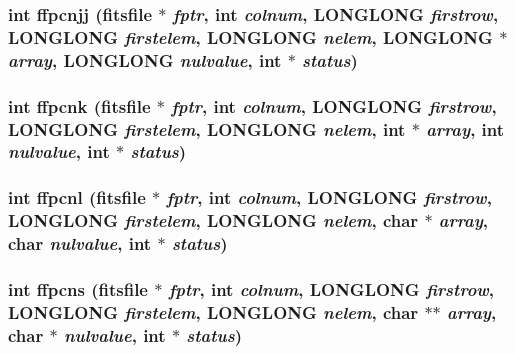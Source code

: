 \subsubsection{\setlength{\rightskip}{0pt plus 5cm}int ffpcnjj (\bf{fitsfile} $\ast$ {\em fptr}, int {\em colnum}, \bf{LONGLONG} {\em firstrow}, \bf{LONGLONG} {\em firstelem}, \bf{LONGLONG} {\em nelem}, \bf{LONGLONG} $\ast$ {\em array}, \bf{LONGLONG} {\em nulvalue}, int $\ast$ {\em status})}\label{test_2roimasker_2fitsio_8h_74f7a5525896c9793648df097c2bdcc9}


\subsubsection{\setlength{\rightskip}{0pt plus 5cm}int ffpcnk (\bf{fitsfile} $\ast$ {\em fptr}, int {\em colnum}, \bf{LONGLONG} {\em firstrow}, \bf{LONGLONG} {\em firstelem}, \bf{LONGLONG} {\em nelem}, int $\ast$ {\em array}, int {\em nulvalue}, int $\ast$ {\em status})}\label{test_2roimasker_2fitsio_8h_d93fc5e0ad1ffc1672875c4cd27ce94d}


\subsubsection{\setlength{\rightskip}{0pt plus 5cm}int ffpcnl (\bf{fitsfile} $\ast$ {\em fptr}, int {\em colnum}, \bf{LONGLONG} {\em firstrow}, \bf{LONGLONG} {\em firstelem}, \bf{LONGLONG} {\em nelem}, char $\ast$ {\em array}, char {\em nulvalue}, int $\ast$ {\em status})}\label{test_2roimasker_2fitsio_8h_02845255614e2b0e1dce064727cd2303}


\subsubsection{\setlength{\rightskip}{0pt plus 5cm}int ffpcns (\bf{fitsfile} $\ast$ {\em fptr}, int {\em colnum}, \bf{LONGLONG} {\em firstrow}, \bf{LONGLONG} {\em firstelem}, \bf{LONGLONG} {\em nelem}, char $\ast$$\ast$ {\em array}, char $\ast$ {\em nulvalue}, int $\ast$ {\em status})}\label{test_2roimasker_2fitsio_8h_ee8210b9d65f49d0cd026caec5413005}


